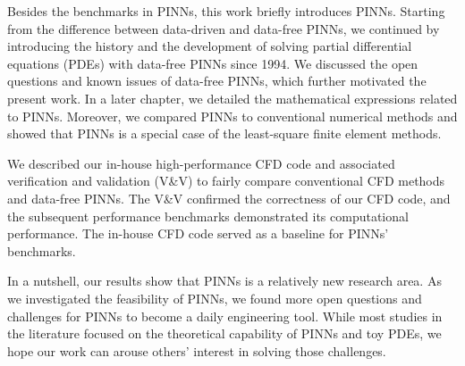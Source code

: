 {Besides the benchmarks in PINNs, this work briefly introduces PINNs.
Starting from the difference between data-driven and data-free PINNs, we continued by introducing the history and the development of solving partial differential equations (PDEs) with data-free PINNs since 1994.
We discussed the open questions and known issues of data-free PINNs, which further motivated the present work.
In a later chapter, we detailed the mathematical expressions related to PINNs.
Moreover, we compared PINNs to conventional numerical methods and showed that PINNs is a special case of the least-square finite element methods.

We described our in-house high-performance CFD code and associated verification and validation (V\&V) to fairly compare conventional CFD methods and data-free PINNs.
The V\&V confirmed the correctness of our CFD code, and the subsequent performance benchmarks demonstrated its computational performance.
The in-house CFD code served as a baseline for PINNs' benchmarks.

In a nutshell, our results show that PINNs is a relatively new research area.
As we investigated the feasibility of PINNs, we found more open questions and challenges for PINNs to become a daily engineering tool.
While most studies in the literature focused on the theoretical capability of PINNs and toy PDEs, we hope our work can arouse others' interest in solving those challenges.
}
